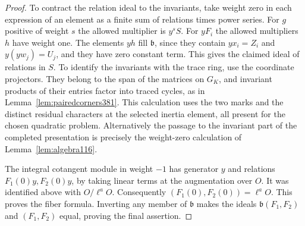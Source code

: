 \documentclass[a4paper,11pt]{article}
\theoremstyle{definition}
\theoremstyle{remark}
\numberwithin{equation}{section}
\begin{document}
\begin{proof}
To contract the relation ideal to the invariants, take
weight zero in each expression of an element as a finite sum
of relations times power series. For \(g\) positive of
weight \(s\) the allowed multiplier is \(y^s S\).
For \(yF_i\) the allowed multipliers \(h\) have weight one.
The elements \(yh\) fill \(\mathfrak b\), since they contain
\(y x_i=Z_i\) and \(y(yw_j)=U_j\), and they have zero
constant term. This gives the claimed ideal of relations
in \(S\). To identify the invariants with the trace ring, use
the coordinate projectors. They belong to the span of the matrices
on \(G_K\), and invariant products of their entries factor
into traced cycles, as in Lemma~\ref{lem:pairedcorners381}.
This calculation uses the two marks and the distinct residual
characters at the selected inertia element, all present for
the chosen quadratic problem. Alternatively the passage to
the invariant part of the completed presentation is precisely
the weight-zero calculation of Lemma~\ref{lem:algebra116}.

The integral cotangent module in weight \(-1\) has generator
\(y\) and relations \(F_1(0)y,F_2(0)y\), by taking linear
terms at the augmentation over \(O\). It was identified above
with \(O/\ell^aO\). Consequently
\((F_1(0),F_2(0))=\ell^aO\). This proves the fiber formula.
Inverting any member of \(\mathfrak b\) makes the ideals
\(\mathfrak b(F_1,F_2)\) and \((F_1,F_2)\) equal, proving
the final assertion.
\end{proof}
\end{document}
